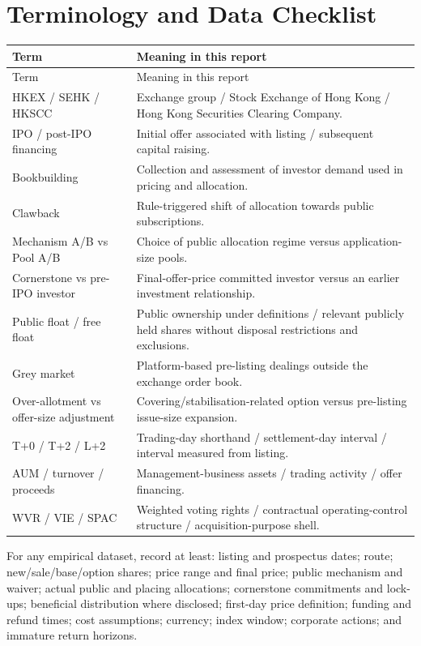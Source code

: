 \documentclass[11pt,a4paper]{article}
\begin{document}
\section{Terminology and Data Checklist}
\begin{longtable}{@{}L{4.2cm}L{11.3cm}@{}}
\toprule Term & Meaning in this report\\\midrule\endfirsthead
\toprule Term & Meaning in this report\\\midrule\endhead
HKEX / SEHK / HKSCC & Exchange group / Stock Exchange of Hong Kong / Hong Kong Securities Clearing Company.\\
IPO / post-IPO financing & Initial offer associated with listing / subsequent capital raising.\\
Bookbuilding & Collection and assessment of investor demand used in pricing and allocation.\\
Clawback & Rule-triggered shift of allocation towards public subscriptions.\\
Mechanism A/B vs Pool A/B & Choice of public allocation regime versus application-size pools.\\
Cornerstone vs pre-IPO investor & Final-offer-price committed investor versus an earlier investment relationship.\\
Public float / free float & Public ownership under definitions / relevant publicly held shares without disposal restrictions and exclusions.\\
Grey market & Platform-based pre-listing dealings outside the exchange order book.\\
Over-allotment vs offer-size adjustment & Covering/stabilisation-related option versus pre-listing issue-size expansion.\\
T+0 / T+2 / L+2 & Trading-day shorthand / settlement-day interval / interval measured from listing.\\
AUM / turnover / proceeds & Management-business assets / trading activity / offer financing.\\
WVR / VIE / SPAC & Weighted voting rights / contractual operating-control structure / acquisition-purpose shell.\\
\bottomrule
\end{longtable}

For any empirical dataset, record at least: listing and prospectus dates; route; new/sale/base/option shares; price range and final price; public mechanism and waiver; actual public and placing allocations; cornerstone commitments and lock-ups; beneficial distribution where disclosed; first-day price definition; funding and refund times; cost assumptions; currency; index window; corporate actions; and immature return horizons.
\end{document}
